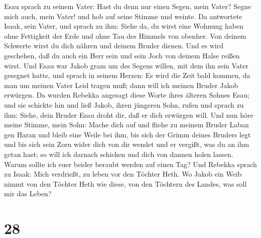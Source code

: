  Esau sprach zu seinem Vater: Hast du denn nur einen Segen,
mein Vater? Segne mich auch, mein Vater! und hob auf seine Stimme und
weinte.  Da antwortete Isaak, sein Vater, und sprach zu
ihm: Siehe da, du wirst eine Wohnung haben ohne Fettigkeit der Erde und
ohne Tau des Himmels von obenher.  Von deinem Schwerte
wirst du dich nähren und deinem Bruder dienen. Und es wird geschehen,
daß du auch ein Herr sein und sein Joch von deinem Halse reißen wirst.
 Und Esau war Jakob gram um des Segens willen, mit dem ihn
sein Vater gesegnet hatte, und sprach in seinem Herzen: Es wird die Zeit
bald kommen, da man um meinen Vater Leid tragen muß; dann will ich
meinen Bruder Jakob erwürgen.  Da wurden Rebekka angesagt
diese Worte ihres älteren Sohnes Esau; und sie schickte hin und ließ
Jakob, ihren jüngeren Sohn, rufen und sprach zu ihm: Siehe, dein Bruder
Esau droht dir, daß er dich erwürgen will.  Und nun höre
meine Stimme, mein Sohn: Mache dich auf und fliehe zu meinem Bruder
Laban gen Haran  und bleib eine Weile bei ihm, bis sich der
Grimm deines Bruders legt  und bis sich sein Zorn wider
dich von dir wendet und er vergißt, was du an ihm getan hast; so will
ich darnach schicken und dich von dannen holen lassen. Warum sollte ich
euer beider beraubt werden auf einen Tag?  Und Rebekka
sprach zu Isaak: Mich verdrießt, zu leben vor den Töchter Heth. Wo Jakob
ein Weib nimmt von den Töchter Heth wie diese, von den Töchtern des
Landes, was soll mir das Leben?

\hypertarget{section-27}{%
\section{28}\label{section-27}}

